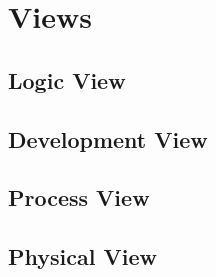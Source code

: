 \section{Views} 
\label{sec:views}


\subsection{Logic View}


\subsection{Development View}


\subsection{Process View}


\subsection{Physical View}